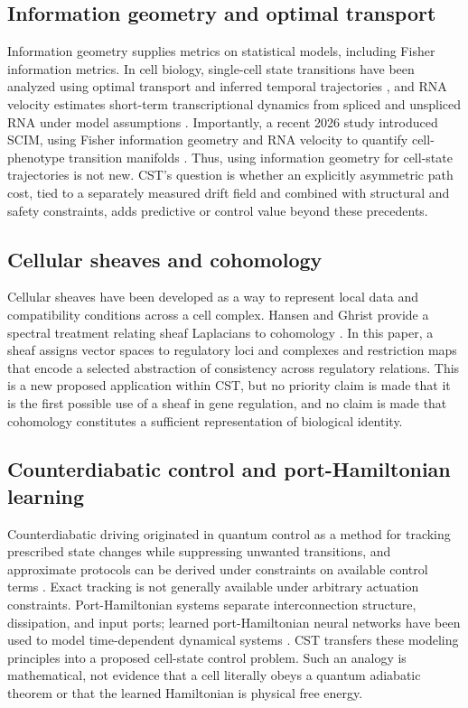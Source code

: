 \documentclass[11pt,a4paper]{article}
\theoremstyle{definition}
\theoremstyle{remark}
\begin{document}
\subsection{Information geometry and optimal transport}
Information geometry supplies metrics on statistical models, including Fisher information metrics. In cell biology, single-cell state transitions have been analyzed using optimal transport and inferred temporal trajectories \cite{Schiebinger2019}, and RNA velocity estimates short-term transcriptional dynamics from spliced and unspliced RNA under model assumptions \cite{LaManno2018,scVelo2020}. Importantly, a recent 2026 study introduced SCIM, using Fisher information geometry and RNA velocity to quantify cell-phenotype transition manifolds \cite{Huang2026}. Thus, using information geometry for cell-state trajectories is not new. CST's question is whether an explicitly asymmetric path cost, tied to a separately measured drift field and combined with structural and safety constraints, adds predictive or control value beyond these precedents.

\subsection{Cellular sheaves and cohomology}
Cellular sheaves have been developed as a way to represent local data and compatibility conditions across a cell complex. Hansen and Ghrist provide a spectral treatment relating sheaf Laplacians to cohomology \cite{HansenGhrist2019}. In this paper, a sheaf assigns vector spaces to regulatory loci and complexes and restriction maps that encode a selected abstraction of consistency across regulatory relations. This is a new proposed application within CST, but no priority claim is made that it is the first possible use of a sheaf in gene regulation, and no claim is made that cohomology constitutes a sufficient representation of biological identity.

\subsection{Counterdiabatic control and port-Hamiltonian learning}
Counterdiabatic driving originated in quantum control as a method for tracking prescribed state changes while suppressing unwanted transitions, and approximate protocols can be derived under constraints on available control terms \cite{Sels2017}. Exact tracking is not generally available under arbitrary actuation constraints. Port-Hamiltonian systems separate interconnection structure, dissipation, and input ports; learned port-Hamiltonian neural networks have been used to model time-dependent dynamical systems \cite{Desai2021,Cherifi2020}. CST transfers these modeling principles into a proposed cell-state control problem. Such an analogy is mathematical, not evidence that a cell literally obeys a quantum adiabatic theorem or that the learned Hamiltonian is physical free energy.
\end{document}
